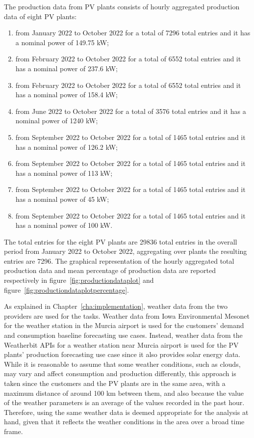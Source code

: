 The production data from PV plants consists of hourly aggregated production data of eight PV plants:
\begin{enumerate}
  \item from January 2022 to October 2022 for a total of 7296 total entries and it has a nominal power of 149.75 kW;
  \item from February 2022 to October 2022 for a total of 6552 total entries and it has a nominal power of 237.6 kW;
  \item from February 2022 to October 2022 for a total of 6552 total entries and it has a nominal power of 158.4 kW;
  \item from June 2022 to October 2022 for a total of 3576 total entries and it has a nominal power of 1240 kW;
  \item from September 2022 to October 2022 for a total of 1465 total entries and it has a nominal power of 126.2 kW;
  \item from September 2022 to October 2022 for a total of 1465 total entries and it has a nominal power of 113 kW;
  \item from September 2022 to October 2022 for a total of 1465 total entries and it has a nominal power of 45 kW;
  \item from September 2022 to October 2022 for a total of 1465 total entries and it has a nominal power of 100 kW.
\end{enumerate}
The total entries for the eight PV plants are 29836 total entries in the overall period from January 2022 to October 2022, aggregating over plants the resulting entries are 7296.
The graphical representation of the hourly aggregated total production data and mean percentage of production data are reported respectively in figure~\ref{fig:productiondataplot} and figure~\ref{fig:productiondataplotpercentage}.

As explained in Chapter~\ref{cha:implementation}, weather data from the two providers are used for the tasks.
Weather data from Iowa Environmental Mesonet for the weather station in the Murcia airport is used for the customers’ demand and consumption baseline forecasting use cases.
Instead, weather data from the Weatherbit APIs for a weather station near Murcia airport is used for the PV plants’ production forecasting use case since it also provides solar energy data.
While it is reasonable to assume that some weather conditions, such as clouds, may vary and affect consumption and production differently, this approach is taken since the customers and the PV plants are in the same area, with a maximum distance of around 100 km between them, and also because the value of the weather parameters is an average of the values recorded in the past hour.
Therefore, using the same weather data is deemed appropriate for the analysis at hand, given that it reflects the weather conditions in the area over a broad time frame.

